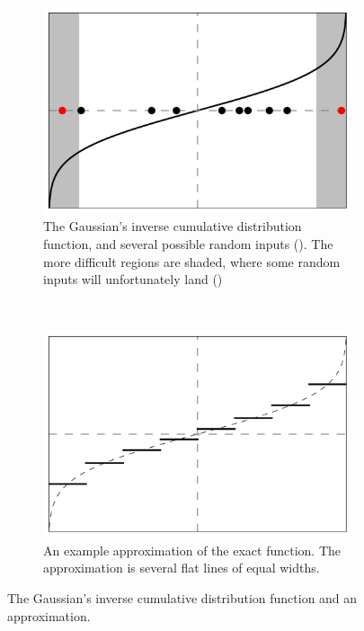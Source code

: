 \documentclass[11pt,a4paper,twoside,english]{extarticle}
\begin{document}
\begin{figure}[htb]
\centering
\begin{subfigure}[t]{0.45\linewidth}
\centering
\includegraphics[width=\linewidth]{inverse_cdf_function_tails_simplified}
\begin{minipage}[t]{0.9\linewidth}
\caption{The Gaussian's inverse cumulative distribution function, and several possible random inputs (\CIRCLE). The more difficult regions are shaded, where some random inputs will unfortunately land ({\color{red}\CIRCLE})}
\label{fig:inverse_cdf_function_tails_simplified}
\end{minipage}
\end{subfigure}%
~
\begin{subfigure}[t]{0.45\linewidth}
\centering
\includegraphics[width=\linewidth]{inverse_cdf_uniform_discretisation_unshaded_simplified}
\begin{minipage}[t]{0.9\linewidth}
\caption{An example approximation of the exact function. The approximation is several flat lines of equal widths.}
\label{fig:inverse_cdf_uniform_discretisation_unshaded_simplified}
\end{minipage}
\end{subfigure}
\caption{The Gaussian's inverse cumulative distribution function and an approximation.}
\label{fig:gaussian_inverse_cdf}
\end{figure}
\end{document}
